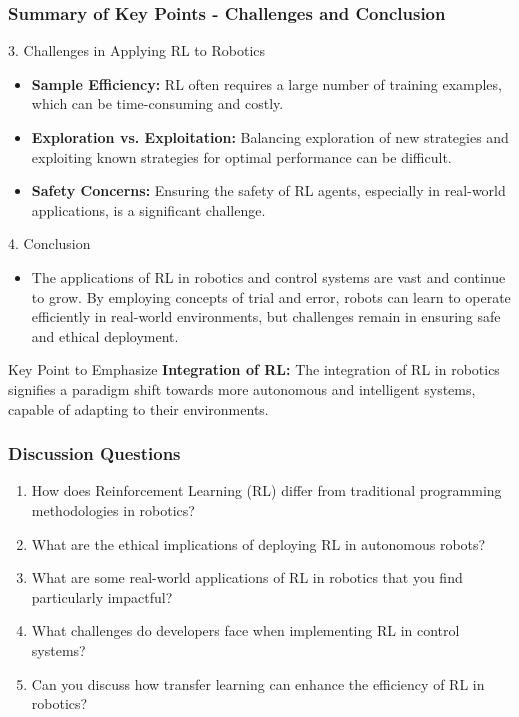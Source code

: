 \documentclass[aspectratio=169]{beamer}
\begin{document}
\begin{frame}[fragile]
    \frametitle{Summary of Key Points - Challenges and Conclusion}
    \begin{block}{3. Challenges in Applying RL to Robotics}
        \begin{itemize}
            \item \textbf{Sample Efficiency:} RL often requires a large number of training examples, which can be time-consuming and costly.
            \item \textbf{Exploration vs. Exploitation:} Balancing exploration of new strategies and exploiting known strategies for optimal performance can be difficult.
            \item \textbf{Safety Concerns:} Ensuring the safety of RL agents, especially in real-world applications, is a significant challenge.
        \end{itemize}
    \end{block}
    
    \begin{block}{4. Conclusion}
        \begin{itemize}
            \item The applications of RL in robotics and control systems are vast and continue to grow. By employing concepts of trial and error, robots can learn to operate efficiently in real-world environments, but challenges remain in ensuring safe and ethical deployment.
        \end{itemize}
    \end{block}
    
    \begin{block}{Key Point to Emphasize}
        \textbf{Integration of RL:} The integration of RL in robotics signifies a paradigm shift towards more autonomous and intelligent systems, capable of adapting to their environments.
    \end{block}
\end{frame}

\begin{frame}[fragile]
    \frametitle{Discussion Questions}
    
    \begin{enumerate}
        \item How does Reinforcement Learning (RL) differ from traditional programming methodologies in robotics?
        \item What are the ethical implications of deploying RL in autonomous robots?
        \item What are some real-world applications of RL in robotics that you find particularly impactful?
        \item What challenges do developers face when implementing RL in control systems?
        \item Can you discuss how transfer learning can enhance the efficiency of RL in robotics?
    \end{enumerate}
\end{frame}
\end{document}
